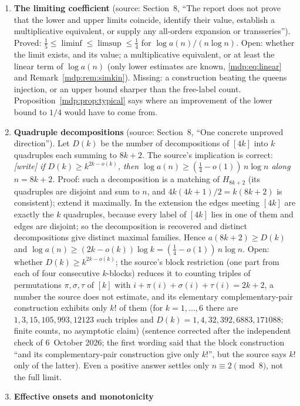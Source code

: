 \documentclass[11pt,letterpaper]{article}
\numberwithin{equation}{section}
\theoremstyle{remark}\newtheorem{remark}[theorem]{Remark}
\begin{document}
\begin{enumerate}
\item\label{mdp:q:limit} \textbf{The limiting coefficient} (source:
 Section~8, ``The report does not prove that the lower and upper limits
 coincide, identify their value, establish a multiplicative equivalent, or
 supply any all-orders expansion or transseries''). Proved:
 $\tfrac15\le\liminf\le\limsup\le\tfrac14$ for $\log a(n)/(n\log n)$.
 Open: whether the limit exists, and its value; a multiplicative
 equivalent, or at least the linear term of $\log a(n)$ (only lower
 estimates are known, \eqref{mdp:eq:linear} and
 Remark~\ref{mdp:rem:simkin}). Missing: a construction beating the
 queens injection, or an upper bound sharper than the free-label count.
 Proposition~\ref{mdp:prop:typical} says where an improvement of the lower
 bound to $1/4$ would have to come from.
\item\label{mdp:q:quadruples} \textbf{Quadruple decompositions} (source:
 Section~8, ``One concrete unproved direction''). Let $D(k)$ be the number
 of decompositions of $[4k]$ into $k$ quadruples each summing to $8k+2$. The
 source's implication is correct: \emph{[write] if $D(k)\ge k^{2k-o(k)}$,
 then $\log a(n)\ge(\tfrac14-o(1))\,n\log n$ along $n=8k+2$.} Proof: such a
 decomposition is a matching of $H_{8k+2}$ (its quadruples are disjoint and
 sum to $n$, and $4k(4k+1)/2=k(8k+2)$ is consistent); extend it maximally.
 In the extension the edges meeting $[4k]$ are exactly the $k$ quadruples,
 because every label of $[4k]$ lies in one of them and edges are disjoint;
 so the decomposition is recovered and distinct decompositions give
 distinct maximal families. Hence $a(8k+2)\ge D(k)$ and
 $\log a(n)\ge(2k-o(k))\log k=(\tfrac14-o(1))\,n\log n$. Open: whether
 $D(k)\ge k^{2k-o(k)}$; the source's block restriction (one part from each of
 four consecutive $k$-blocks) reduces it to counting triples of permutations
 $\pi,\sigma,\tau$ of $[k]$ with $i+\pi(i)+\sigma(i)+\tau(i)=2k+2$, a number the
 source does not estimate, and its elementary complementary-pair construction
 exhibits only $k!$ of them (for $k=1,\dots,6$ there are $1,3,15,105,993,12123$
 such triples and $D(k)=1,4,32,392,6883,171088$; finite counts, no asymptotic
 claim) \textup{(sentence corrected after the independent check of
 6~October 2026; the first wording said that the block construction ``and its
 complementary-pair construction give only $k!$'', but the source says $k!$
 only of the latter)}. Even a positive answer settles only
 $n\equiv2\pmod 8$, not the full limit.
\item\label{mdp:q:effective} \textbf{Effective onsets and monotonicity}

\end{enumerate}
\end{document}
